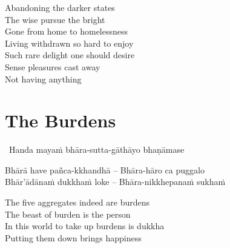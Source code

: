 \begin{english-verses}
  Abandoning the darker states\\
  The wise pursue the bright\\
  Gone from home to homelessness\ifdigitalversion\makeatletter\hyperlink{endnote37-appendix}\makeatother\fi\\
  Living withdrawn so hard to enjoy\ifdigitalversion\makeatletter\hyperlink{endnote38-appendix}\makeatother\fi\\
  Such rare delight one should desire\\
  Sense pleasures cast away\\
  Not having anything
\end{english-verses}

\suttaRef{[Dhp 85-87]}




\section{The Burdens}
\label{burdens}

\begin{leader}
  \anglebracketleft\ \hspace{-0.5mm}Handa mayaṁ bhāra-sutta-gāthāyo bhaṇāmase \hspace{-0.5mm}\anglebracketright\
\end{leader}

\begin{verses}
  Bhārā have pañca-kkhandhā – Bhāra-hāro ca puggalo\\
  Bhār'ādānaṁ dukkhaṁ loke – Bhāra-nikkhepanaṁ sukhaṁ
\end{verses}

\begin{english-verses}
  The five aggregates indeed are burdens\\
  The beast of burden is the person\ifdigitalversion\makeatletter\hyperlink{endnote39-appendix}\makeatother\fi\\
  In this world to take up burdens is dukkha\\
  Putting them down brings happiness
\end{english-verses}


